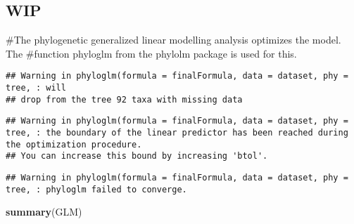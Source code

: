 \documentclass[
]{article}
\newenvironment{Shaded}{\begin{snugshade}}{\end{snugshade}}
\newcommand{\CommentTok}[1]{\textcolor[rgb]{0.56,0.35,0.01}{\textit{#1}}}
\newcommand{\DataTypeTok}[1]{\textcolor[rgb]{0.13,0.29,0.53}{#1}}
\newcommand{\DecValTok}[1]{\textcolor[rgb]{0.00,0.00,0.81}{#1}}
\newcommand{\FloatTok}[1]{\textcolor[rgb]{0.00,0.00,0.81}{#1}}
\newcommand{\KeywordTok}[1]{\textcolor[rgb]{0.13,0.29,0.53}{\textbf{#1}}}
\newcommand{\NormalTok}[1]{#1}
\newcommand{\OperatorTok}[1]{\textcolor[rgb]{0.81,0.36,0.00}{\textbf{#1}}}
\newcommand{\StringTok}[1]{\textcolor[rgb]{0.31,0.60,0.02}{#1}}
\begin{document}
\hypertarget{wip}{%
\subsection{WIP}\label{wip}}

\#The phylogenetic generalized linear modelling analysis optimizes the
model. The \#function phyloglm from the phylolm package is used for
this.

\begin{Shaded}
\end{Shaded}

\begin{verbatim}
## Warning in phyloglm(formula = finalFormula, data = dataset, phy = tree, : will
## drop from the tree 92 taxa with missing data
\end{verbatim}

\begin{verbatim}
## Warning in phyloglm(formula = finalFormula, data = dataset, phy = tree, : the boundary of the linear predictor has been reached during the optimization procedure.
## You can increase this bound by increasing 'btol'.
\end{verbatim}

\begin{verbatim}
## Warning in phyloglm(formula = finalFormula, data = dataset, phy = tree, : phyloglm failed to converge.
\end{verbatim}

\begin{Shaded}
\begin{Highlighting}[]
\KeywordTok{summary}\NormalTok{(GLM)}
\end{Highlighting}
\end{Shaded}
\end{document}
